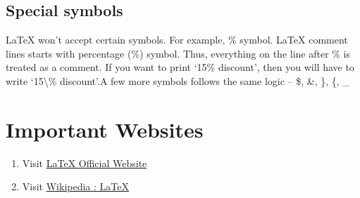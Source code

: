 \documentclass{article}
\begin{document}
\subsection*{Special symbols}
LaTeX won't accept certain symbols. For example, \% symbol. \LaTeX{} comment lines starts with percentage (\%) symbol. Thus, everything on the line after \% is treated as a comment. If you want to print `15\% discount', then you will have to write `15\textbackslash\% discount'.A few more symbols follows the same logic -- \$, \&, \}, \{, \_

\section{Important Websites}
\begin{enumerate}
	\item Visit \href{https://www.latex-project.org/}{\LaTeX{} Official Website}
	\item Visit \href{https://en.wikipedia.org/wiki/LaTeX}{Wikipedia : \LaTeX{}}
\end{enumerate}
\end{document}
